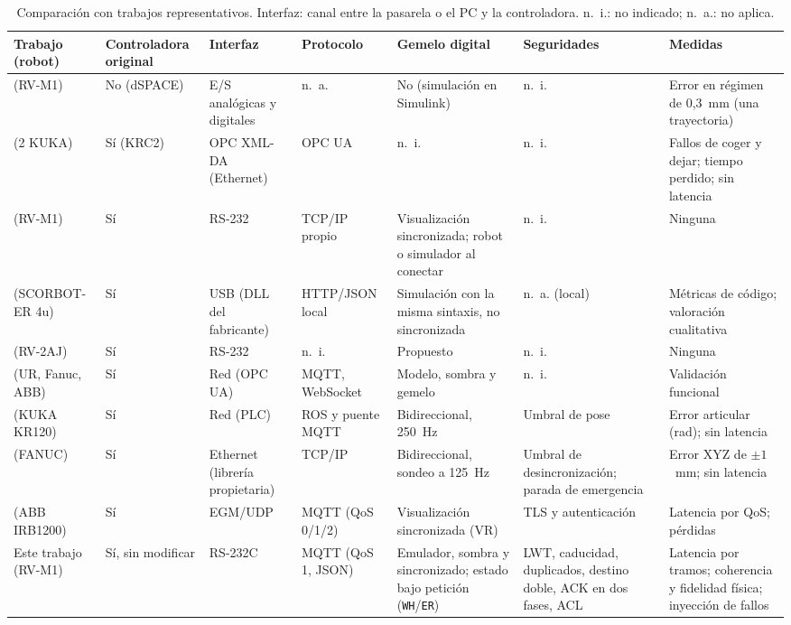 \begin{table}[t]
  \centering
  \caption{Comparación con trabajos representativos. Interfaz: canal entre la pasarela o el PC y la controladora. n.~i.: no indicado; n.~a.: no aplica.}
  \label{tab:comparativa}
  \footnotesize
  \setlength{\tabcolsep}{3pt}
  \begin{tabular}{@{}p{2.1cm}p{1.3cm}p{1.8cm}p{1.9cm}p{2.4cm}p{2.5cm}p{2.5cm}@{}}
    \toprule
    Trabajo (robot) & Controladora original & Interfaz & Protocolo & Gemelo digital & Seguridades & Medidas \\
    \midrule
    \citet{roldan2018enhancing} (RV-M1) & No (dSPACE) & E/S analógicas y digitales & n.~a. & No (simulación en Simulink) & n.~i. & Error en régimen de 0,3~mm (una trayectoria) \\
    \citet{holmes2025retrofitting} (2 KUKA) & Sí (KRC2) & OPC XML-DA (Ethernet) & OPC UA & n.~i. & n.~i. & Fallos de coger y dejar; tiempo perdido; sin latencia \\
    \citet{mihali2005effective} (RV-M1) & Sí & RS-232 & TCP/IP propio & Visualización sincronizada; robot o simulador al conectar & n.~i. & Ninguna \\
    \citet{kutzer2023scorbot} (SCORBOT-ER 4u) & Sí & USB (DLL del fabricante) & HTTP/JSON local & Simulación con la misma sintaxis, no sincronizada & n.~a. (local) & Métricas de código; valoración cualitativa \\
    \citet{patrao2025understanding} (RV-2AJ) & Sí & RS-232 & n.~i. & Propuesto & n.~i. & Ninguna \\
    \citet{kaarlela2023digital} (UR, Fanuc, ABB) & Sí & Red (OPC UA) & MQTT, WebSocket & Modelo, sombra y gemelo & n.~i. & Validación funcional \\
    \citet{liang2020bidirectional} (KUKA KR120) & Sí & Red (PLC) & ROS y puente MQTT & Bidireccional, 250~Hz & Umbral de pose & Error articular (rad); sin latencia \\
    \citet{chang2025construction} (FANUC) & Sí & Ethernet (librería propietaria) & TCP/IP & Bidireccional, sondeo a 125~Hz & Umbral de desincronización; parada de emergencia & Error XYZ de $\pm 1$~mm; sin latencia \\
    \citet{luu2025enhancing} (ABB IRB1200) & Sí & EGM/UDP & MQTT (QoS 0/1/2) & Visualización sincronizada (VR) & TLS y autenticación & Latencia por QoS; pérdidas \\
    \midrule
    Este trabajo (RV-M1) & Sí, sin modificar & RS-232C & MQTT (QoS 1, JSON) & Emulador, sombra y sincronizado; estado bajo petición (\texttt{WH}/\texttt{ER}) & LWT, caducidad, duplicados, destino doble, ACK en dos fases, ACL & Latencia por tramos; coherencia y fidelidad física; inyección de fallos \\
    \bottomrule
  \end{tabular}
\end{table}

